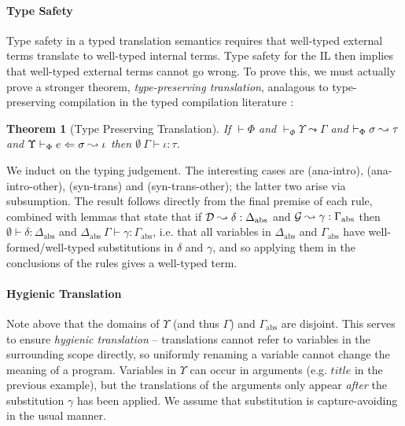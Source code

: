 \documentclass[10pt,preprint]{sigplanconf}
\newtheorem{theorem}{Theorem}
\newenvironment{proof-sketch}{\noindent{\emph{Proof Sketch.}}}{\qed}
\begin{document}
\paragraph{Type Safety}
Type safety in a typed translation semantics requires that well-typed external terms translate to well-typed internal terms. Type safety for the IL \cite{pfpl} then implies that well-typed external terms cannot go wrong. To prove this, we must actually prove a stronger theorem, \emph{type-preserving translation}, analagous to type-preserving compilation in the typed compilation literature \cite{tarditi+:til-OLD}:%

\begin{theorem}[Type Preserving Translation]
If $\vdash \Phi$ and $\vdash_\Phi \Upsilon \leadsto \Gamma$ and $\vdash_\Phi \sigma \leadsto \tau$ and $\Upsilon \vdash_{\Phi} e \Leftarrow \sigma \leadsto \iota$ then $\emptyset~\Gamma \vdash \iota : \tau$.
\end{theorem}
\begin{proof-sketch}
We induct on the typing judgement. The interesting cases are (ana-intro), (ana-intro-other), (syn-trans) and (syn-trans-other); the latter two arise via subsumption. The result follows directly from the final premise of each rule, combined with lemmas that state that if $\mathcal{D} \leadsto \delta : \Delta_\text{abs}$ and $\mathcal{G} \leadsto \gamma : \Gamma_\text{abs}$ then $\emptyset \vdash \delta : \Delta_\text{abs}$ and $\Delta_\text{abs}~\Gamma \vdash \gamma : \Gamma_\text{abs}$, i.e. that all variables in $\Delta_\text{abs}$ and $\Gamma_\text{abs}$ have well-formed/well-typed substitutions in $\delta$ and $\gamma$,  and so applying them in the conclusions of the rules gives a well-typed term.
\end{proof-sketch}

\paragraph{Hygienic Translation} 
Note above that the domains of $\Upsilon$ (and thus $\Gamma$)  and $\Gamma_\text{abs}$ are disjoint. This serves to ensure \emph{hygienic translation} -- translations cannot refer to variables in the surrounding scope directly, so uniformly renaming a variable cannot change the meaning of a program. Variables in $\Upsilon$ can  occur in arguments (e.g. $title$ in the previous example), but the translations of the arguments only appear \emph{after} the substitution $\gamma$ has been applied. We assume that substitution is capture-avoiding in the usual manner. %
\end{document}
